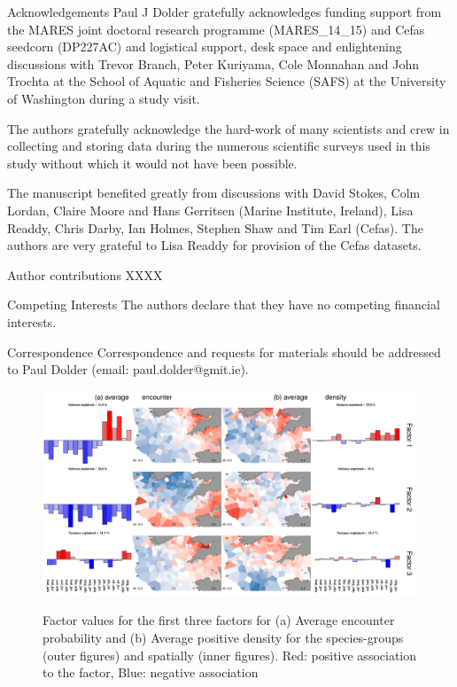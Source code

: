 \documentclass{nature}
\begin{document}
\begin{addendum}
 \item [Acknowledgements] Paul J Dolder gratefully acknowledges funding support
	 from the MARES joint doctoral research programme (MARES\_14\_15) and
	 Cefas seedcorn (DP227AC) and logistical support, desk space and
	 enlightening discussions with Trevor Branch, Peter Kuriyama, Cole
	 Monnahan and John Trochta at the School of Aquatic and Fisheries
	 Science (SAFS) at the University of Washington during a study visit.
	 
	 The authors gratefully acknowledge the hard-work of many scientists
	 and crew in collecting and storing data during the numerous scientific
	 surveys used in this study without which it would not have been
	 possible.  
	 
	 The manuscript benefited greatly from discussions with David Stokes,
	 Colm Lordan, Claire Moore and Hans Gerritsen (Marine Institute,
	 Ireland), Lisa Readdy, Chris Darby, Ian Holmes, Stephen Shaw and Tim
	 Earl (Cefas).  The authors are very grateful to Lisa Readdy for
	 provision of the Cefas datasets.

 \item[Author contributions] XXXX

 \item[Competing Interests] The authors declare that they have
	 no competing financial interests.
 \item[Correspondence] Correspondence and requests for materials
 should be addressed to Paul Dolder (email: paul.dolder@gmit.ie).
 \end{addendum}



\begin{figure}
\begin{center}
	\includegraphics[width=\linewidth]{"Fig1_Combined"}
	\label{fig:1}
	\caption{Factor values for the first three factors for (a) Average
		encounter probability and (b) Average positive density for the
		species-groups (outer figures) and spatially (inner figures).
		Red: positive association to the factor, Blue: negative
		association}
\end{center}
\end{figure}
\end{document}
